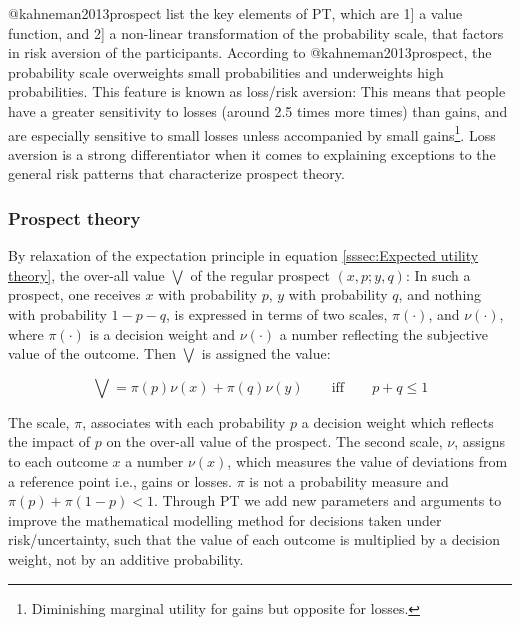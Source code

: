 \documentclass[]{article}
\let\rmarkdownfootnote\footnote%
\def\footnote{\protect\rmarkdownfootnote}
\begin{document}
@kahneman2013prospect list the key elements of PT, which are 1{]} a
value function, and 2{]} a non-linear transformation of the probability
scale, that factors in risk aversion of the participants. According to
@kahneman2013prospect, the probability scale overweights small
probabilities and underweights high probabilities. This feature is known
as loss/risk aversion: This means that people have a greater sensitivity
to losses (around 2.5 times more times) than gains, and are especially
sensitive to small losses unless accompanied by small
gains\footnote{Diminishing marginal utility for gains but opposite for losses.}.
Loss aversion is a strong differentiator when it comes to explaining
exceptions to the general risk patterns that characterize prospect
theory.\medskip 

\subsubsection{Prospect theory}
\label{sssec:Prospect theory}

By relaxation of the expectation principle in equation
\ref{sssec:Expected utility theory}, the over-all value
\(\mathbf{\bigvee}\) of the regular prospect \((x,p;y,q)\): In such a
prospect, one receives \(x\) with probability \(p\), \(y\) with
probability \(q\), and nothing with probability \(1-p-q\), is expressed
in terms of two scales, \(\pi(\cdot)\), and \(\nu(\cdot)\), where
\(\pi(\cdot)\) is a decision weight and \(\nu(\cdot)\) a number
reflecting the subjective value of the outcome. Then
\(\mathbf{\bigvee}\) is assigned the value:

\begin{equation}\label{eqn2}
\mathbf{\bigvee}=\pi(p)\nu(x)+\pi(q)\nu(y) \qquad\mbox{iff} \qquad p+q \leq 1
\end{equation}

The scale, \(\pi\), associates with each probability \(p\) a decision
weight which reflects the impact of \(p\) on the over-all value of the
prospect. The second scale, \(\nu\), assigns to each outcome \(x\) a
number \(\nu(x)\), which measures the value of deviations from a
reference point i.e., gains or losses. \(\pi\) is not a probability
measure and \(\pi(p) + \pi(1-p) < 1\). Through PT we add new parameters
and arguments to improve the mathematical modelling method for decisions
taken under risk/uncertainty, such that the value of each outcome is
multiplied by a decision weight, not by an additive probability.
\end{document}

